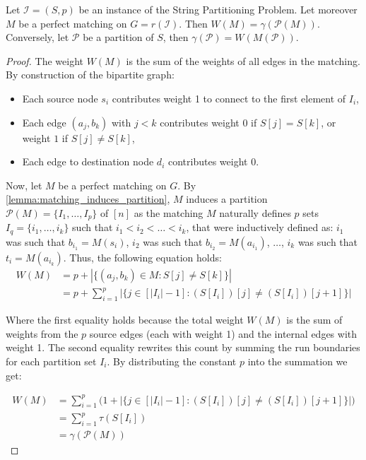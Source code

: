 \begin{lemma} \label{lemma:same_cost}
    Let $\mathcal{I}=(S, p)$ be an instance of the String Partitioning Problem. Let moreover $M$ be a perfect matching on $G = r(\mathcal{I})$. Then $W(M) = \gamma(\mathcal{P}(M))$. Conversely, let $\mathcal{P}$ be a partition of $S$, then $\gamma(\mathcal{P})=W(M(\mathcal{P}))$.
\end{lemma}
\begin{proof}    
    The weight $W(M)$ is the sum of the weights of all edges in the matching. By construction of the bipartite graph:
    \begin{itemize}
        \item Each source node $s_i$ contributes weight 1 to connect to the first element of $I_i$,
        \item Each edge $(a_j, b_k)$ with $j < k$ contributes weight $0$ if $S[j] = S[k]$, or weight $1$ if $S[j] \neq S[k]$,
        \item Each edge to destination node $d_i$ contributes weight $0$.
    \end{itemize}
    
    Now, let $M$ be a perfect matching on $G$. By \cref{lemma:matching_induces_partition}, $M$ induces a partition $\mathcal{P}(M) = \{I_1, \ldots, I_p\}$ of $[n]$ as the matching $M$ naturally defines $p$ sets $I_q=\{i_1,\dots,i_k\}$ such that $i_1 <i_2<\dots<i_k$, that were inductively defined as: $i_1$ was such that $b_{i_1} = M(s_i)$, $i_2$ was such that $b_{i_2} = M(a_{i_1})$, $\dots$, $i_k$ was such that $t_i = M(a_{i_k})$. Thus, the following equation holds:
    \begin{align*}
        W(M) &= p + |\{(a_j, b_k) \in M:S[j] \neq S[k]\}| \\
        &= p + \sum_{i=1}^p |\{j \in [|I_i| - 1]:(S[I_i])[j] \neq (S[I_i])[j+1]\}|
    \end{align*}

    Where the first equality holds because the total weight $W(M)$ is the sum of weights from the $p$ source edges (each with weight 1) and the internal edges with weight 1. The second equality rewrites this count by summing the run boundaries for each partition set $I_i$. By distributing the constant $p$ into the summation we get:

    \begin{align*}
        W(M) &= \sum_{i=1}^p \big( 1 + |\{j \in [|I_i| - 1]:(S[I_i])[j] \neq (S[I_i])[j+1]\}| \big) \\
        &= \sum_{i=1}^p \tau(S[I_i]) \\
        &= \gamma(\mathcal{P}(M))
    \end{align*}
    

\end{proof}
